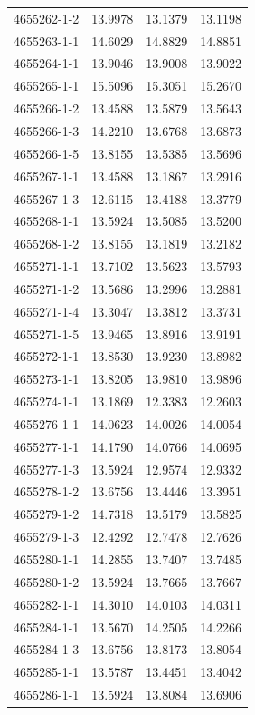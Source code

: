 \begin{longtable}{lrrr}
4655262-1-2 & 13.9978 & 13.1379 & 13.1198 \\
4655263-1-1 & 14.6029 & 14.8829 & 14.8851 \\
4655264-1-1 & 13.9046 & 13.9008 & 13.9022 \\
4655265-1-1 & 15.5096 & 15.3051 & 15.2670 \\
4655266-1-2 & 13.4588 & 13.5879 & 13.5643 \\
4655266-1-3 & 14.2210 & 13.6768 & 13.6873 \\
4655266-1-5 & 13.8155 & 13.5385 & 13.5696 \\
4655267-1-1 & 13.4588 & 13.1867 & 13.2916 \\
4655267-1-3 & 12.6115 & 13.4188 & 13.3779 \\
4655268-1-1 & 13.5924 & 13.5085 & 13.5200 \\
4655268-1-2 & 13.8155 & 13.1819 & 13.2182 \\
4655271-1-1 & 13.7102 & 13.5623 & 13.5793 \\
4655271-1-2 & 13.5686 & 13.2996 & 13.2881 \\
4655271-1-4 & 13.3047 & 13.3812 & 13.3731 \\
4655271-1-5 & 13.9465 & 13.8916 & 13.9191 \\
4655272-1-1 & 13.8530 & 13.9230 & 13.8982 \\
4655273-1-1 & 13.8205 & 13.9810 & 13.9896 \\
4655274-1-1 & 13.1869 & 12.3383 & 12.2603 \\
4655276-1-1 & 14.0623 & 14.0026 & 14.0054 \\
4655277-1-1 & 14.1790 & 14.0766 & 14.0695 \\
4655277-1-3 & 13.5924 & 12.9574 & 12.9332 \\
4655278-1-2 & 13.6756 & 13.4446 & 13.3951 \\
4655279-1-2 & 14.7318 & 13.5179 & 13.5825 \\
4655279-1-3 & 12.4292 & 12.7478 & 12.7626 \\
4655280-1-1 & 14.2855 & 13.7407 & 13.7485 \\
4655280-1-2 & 13.5924 & 13.7665 & 13.7667 \\
4655282-1-1 & 14.3010 & 14.0103 & 14.0311 \\
4655284-1-1 & 13.5670 & 14.2505 & 14.2266 \\
4655284-1-3 & 13.6756 & 13.8173 & 13.8054 \\
4655285-1-1 & 13.5787 & 13.4451 & 13.4042 \\
4655286-1-1 & 13.5924 & 13.8084 & 13.6906 \\

\end{longtable}

